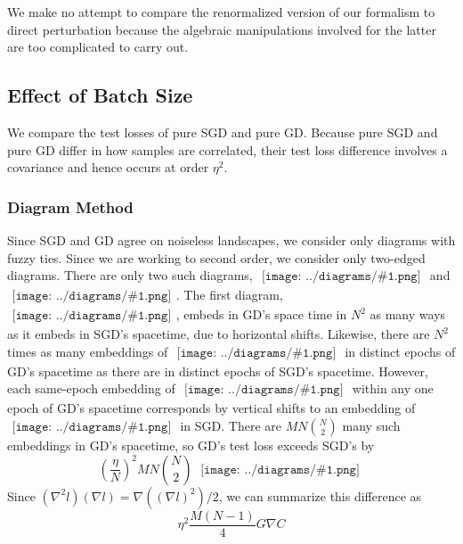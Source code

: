 \documentclass{article}
\newcommand{\wrap}[1]{\left(#1\right)}
\newcommand{\sdia}[1]{\begin{gathered}\texttt{[image: ../diagrams/\#1.png]}\end{gathered}}
\begin{document}
    We make no attempt to compare the renormalized version of our formalism
    to direct perturbation because the algebraic manipulations involved for
    the latter are too complicated to carry out.  

    \subsection*{Effect of Batch Size}
        We compare the test losses of pure SGD and pure GD.  Because pure
        SGD and pure GD differ in how samples are correlated, their test loss
        difference involves a covariance and hence occurs at order $\eta^2$.  

        \subsubsection*{Diagram Method}
            Since SGD and GD agree on noiseless landscapes, we consider only
            diagrams with fuzzy ties.  Since we are working to second order, we
            consider only two-edged diagrams.  There are only two such
            diagrams, $\sdia{(01-2)(02-12)}$ and $\sdia{(01-2)(01-12)}$.  The
            first diagram, $\sdia{(01-2)(02-12)}$, embeds in GD's space time in
            $N^2$ as many ways as it embeds in SGD's spacetime, due to
            horizontal shifts.  Likewise, there are $N^2$ times as many
            embeddings of $\sdia{(01-2)(02-12)}$ in distinct epochs of GD's
            spacetime as there are in distinct epochs of SGD's spacetime.
            However, each same-epoch embedding of $\sdia{(01-2)(01-12)}$ within
            any one epoch of GD's spacetime corresponds by vertical shifts to
            an embedding of $\sdia{(0-1-2)(01-12)}$ in SGD.  There are
            $MN{N\choose 2}$ many such embeddings in GD's spacetime, so GD's
            test loss exceeds SGD's by 
            $$
                \wrap{\frac{\eta}{N}}^2 MN{N\choose 2}~
                \sdia{c(01-2)(01-12)}
            $$
            Since $(\nabla^2 l) (\nabla l) = \nabla((\nabla l)^2)/2$, we can 
            summarize this difference as
            $$
                \eta^2 \frac{M(N-1)}{4} G \nabla C 
            $$
\end{document}
